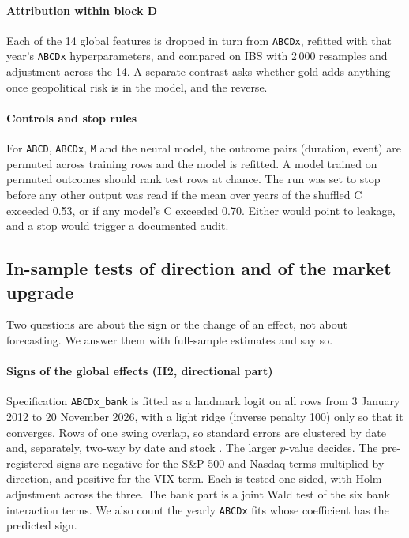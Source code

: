 \paragraph{Attribution within block D} Each of the 14 global features is dropped in turn from
\texttt{ABCDx}, refitted with that year's \texttt{ABCDx} hyperparameters, and compared on IBS with
2\,000 resamples and \citet{Holm1979} adjustment across the 14. A separate contrast asks whether gold adds
anything once geopolitical risk is in the model, and the reverse.

\paragraph{Controls and stop rules} For \texttt{ABCD}, \texttt{ABCDx}, \texttt{M} and the neural model, the
outcome pairs (duration, event) are permuted across training rows and the model is refitted. A
model trained on permuted outcomes should rank test rows at chance. The run was set to stop before
any other output was read if the mean over years of the shuffled C exceeded 0.53, or if any model's
C exceeded 0.70. Either would point to leakage, and a stop would trigger a documented audit.

\subsection{In-sample tests of direction and of the market upgrade}\label{sec:insample}

Two questions are about the sign or the change of an effect, not about forecasting. We answer them
with full-sample estimates and say so.

\paragraph{Signs of the global effects (H2, directional part)} Specification
\texttt{ABCDx\_bank} is fitted as a landmark logit on all rows from 3 January 2012 to 20 November 2026, with a light ridge (inverse
penalty 100) only so that it converges. Rows of one swing overlap, so standard errors are clustered
by date and, separately, two-way by date and stock \citep{CameronGelbachMiller2011}. The larger
$p$-value decides. The pre-registered signs are negative for the S\&P 500 and Nasdaq terms
multiplied by direction, and positive for the VIX term. Each is tested one-sided, with Holm
adjustment across the three. The bank part is a joint Wald test of the six bank interaction terms.
We also count the yearly \texttt{ABCDx} fits whose coefficient has the predicted sign.

